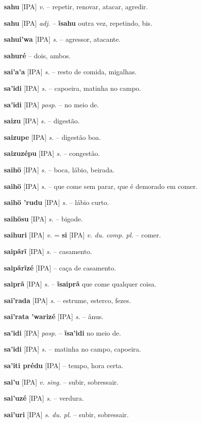 \textbf{sahu} [IPA] \textit{v.} -- repetir, renovar, atacar, agredir.

\textbf{sahu} [IPA] \textit{adj.} -- \textbf{ĩsahu} outra vez, repetindo, bis.

\textbf{sahui'wa} [IPA] \textit{s.} -- agressor, atacante.

\textbf{sahuré} -- dois, ambos.

\textbf{sai'a'a} [IPA] \textit{s.} -- resto de comida, migalhas.

\textbf{sa'idi} [IPA] \textit{s.} -- capoeira, matinha no campo.

\textbf{sa'idi} [IPA] \textit{posp.} -- no meio de.

\textbf{saizu} [IPA] \textit{s.} -- digestão.

\textbf{saizupe} [IPA] \textit{s.} -- digestão boa.

\textbf{saizuzépu} [IPA] \textit{s.} -- congestão.

\textbf{saihö} [IPA] \textit{s.} -- boca, lábio, beirada.

\textbf{saihö} [IPA] \textit{s.} -- que come sem parar, que é demorado em comer.

\textbf{saihö 'rudu} [IPA] \textit{s.} -- lábio curto.

\textbf{saihösu} [IPA] \textit{s.} -- bigode.

\textbf{saihuri} [IPA] \textit{v.} = \textbf{si} [IPA] \textit{v. du. comp. pl.} -- comer.

\textbf{saipãrĩ} [IPA] \textit{s.} -- casamento.

\textbf{saipãrĩzé} [IPA] \textit{} -- caça de casamento.

\textbf{saiprã} [IPA] \textit{s.} -- \textbf{ĩsaiprã} que come qualquer coisa.

\textbf{sai'rada} [IPA] \textit{s.} -- estrume, esterco, fezes.

\textbf{sai'rata 'warizé} [IPA] \textit{s.} -- ânus.

\textbf{sa'idi} [IPA] \textit{posp.} -- \textbf{ĩsa'idi} no meio de.

\textbf{sa'idi} [IPA] \textit{s.} -- matinha no campo, capoeira.

\textbf{sa'iti prédu} [IPA] \textit{} -- tempo, hora certa.

\textbf{sai'u} [IPA] \textit{v. sing.} -- subir, sobressair.

\textbf{sai'uzé} [IPA] \textit{s.} -- verdura.

\textbf{sai'uri} [IPA] \textit{s. du. pl.} -- subir, sobressair.

